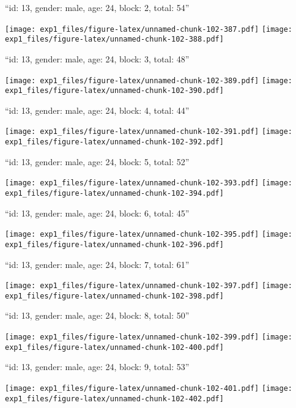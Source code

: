 \documentclass[11pt,,]{article}
\begin{document}
\newpage
[1] 

``id: 13, gender: male, age: 24, block: 2, total: 54''

\texttt{[image: exp1\_files/figure-latex/unnamed-chunk-102-387.pdf]}
\texttt{[image: exp1\_files/figure-latex/unnamed-chunk-102-388.pdf]}

\newpage
[1] 

``id: 13, gender: male, age: 24, block: 3, total: 48''

\texttt{[image: exp1\_files/figure-latex/unnamed-chunk-102-389.pdf]}
\texttt{[image: exp1\_files/figure-latex/unnamed-chunk-102-390.pdf]}

\newpage
[1] 

``id: 13, gender: male, age: 24, block: 4, total: 44''

\texttt{[image: exp1\_files/figure-latex/unnamed-chunk-102-391.pdf]}
\texttt{[image: exp1\_files/figure-latex/unnamed-chunk-102-392.pdf]}

\newpage
[1] 

``id: 13, gender: male, age: 24, block: 5, total: 52''

\texttt{[image: exp1\_files/figure-latex/unnamed-chunk-102-393.pdf]}
\texttt{[image: exp1\_files/figure-latex/unnamed-chunk-102-394.pdf]}

\newpage
[1] 

``id: 13, gender: male, age: 24, block: 6, total: 45''

\texttt{[image: exp1\_files/figure-latex/unnamed-chunk-102-395.pdf]}
\texttt{[image: exp1\_files/figure-latex/unnamed-chunk-102-396.pdf]}

\newpage
[1] 

``id: 13, gender: male, age: 24, block: 7, total: 61''

\texttt{[image: exp1\_files/figure-latex/unnamed-chunk-102-397.pdf]}
\texttt{[image: exp1\_files/figure-latex/unnamed-chunk-102-398.pdf]}

\newpage
[1] 

``id: 13, gender: male, age: 24, block: 8, total: 50''

\texttt{[image: exp1\_files/figure-latex/unnamed-chunk-102-399.pdf]}
\texttt{[image: exp1\_files/figure-latex/unnamed-chunk-102-400.pdf]}

\newpage
[1] 

``id: 13, gender: male, age: 24, block: 9, total: 53''

\texttt{[image: exp1\_files/figure-latex/unnamed-chunk-102-401.pdf]}
\texttt{[image: exp1\_files/figure-latex/unnamed-chunk-102-402.pdf]}
\end{document}
